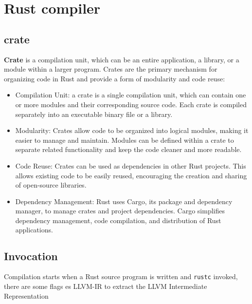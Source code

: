 \documentclass{article}
\begin{document}
\section{Rust compiler}

\subsection{crate}
\textbf{Crate} is a compilation unit, which can be an entire application, a library, or a module within a larger program. Crates are the primary mechanism for organizing code in Rust and provide a form of modularity and code reuse:
\begin{itemize}
    \item Compilation Unit: a crate is a single compilation unit, which can contain one or more modules and their corresponding source code. Each crate is compiled separately into an executable binary file or a library.
    \item Modularity: Crates allow code to be organized into logical modules, making it easier to manage and maintain. Modules can be defined within a crate to separate related functionality and keep the code cleaner and more readable.
    \item Code Reuse: Crates can be used as dependencies in other Rust projects. This allows existing code to be easily reused, encouraging the creation and sharing of open-source libraries.
    \item Dependency Management: Rust uses Cargo, its package and dependency manager, to manage crates and project dependencies. Cargo simplifies dependency management, code compilation, and distribution of Rust applications.
\end{itemize}

\subsection{Invocation}
Compilation starts when a Rust source program is written and \texttt{rustc} invoked, there are some flags es LLVM-IR to extract the LLVM Intermediate Representation  
\end{document}

